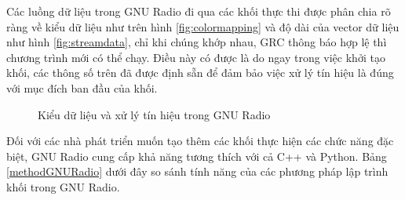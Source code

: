 Các luồng dữ liệu trong GNU Radio đi qua các khối thực thi được phân chia rõ ràng về kiểu dữ liệu như trên hình \ref{fig:colormapping} và độ dài của vector dữ liệu như hình \ref{fig:streamdata}, chỉ khi chúng khớp nhau, GRC thông báo hợp lệ thì chương trình mới có thể chạy. Điều này có được là do ngay trong việc khởi tạo khối, các thông số trên đã được định sẵn để đảm bảo việc xử lý tín hiệu là đúng với mục đích ban đầu của khối.

\begin{figure}[!h]
\centering
{}
\hfill
{}
\hfill
\caption{Kiểu dữ liệu và xử lý tín hiệu trong GNU Radio}
\end{figure}

Đối với các nhà phát triển muốn tạo thêm các khối thực hiện các chức năng đặc biệt, GNU Radio cung cấp khả năng tương thích với cả C++ và Python. Bảng \ref{methodGNURadio} dưới đây so sánh tính năng của các phương pháp lập trình khối trong GNU Radio.

